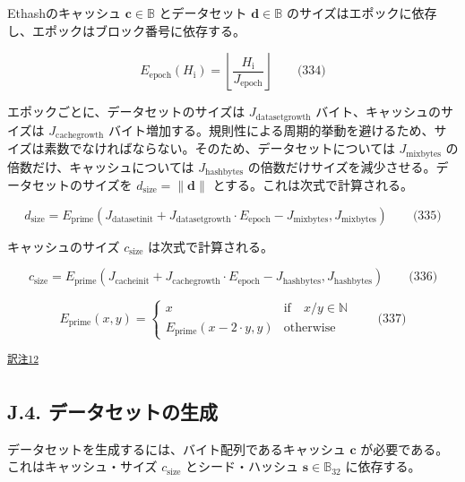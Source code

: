 \documentclass[
]{ltjsarticle}
\begin{document}
Ethashのキャッシュ \(\mathbf{c} \in \mathbb{B}\) とデータセット
\(\mathbf{d} \in \mathbb{B}\)
のサイズはエポックに依存し、エポックはブロック番号に依存する。

\protect\hypertarget{eq-334}{}{}

\[E_{\mathrm{epoch}}(H_{\mathrm{i}}) = \left\lfloor\frac{H_{\mathrm{i}}}{J_{\mathrm{epoch}}}\right\rfloor \qquad \text{(334)}\]

エポックごとに、データセットのサイズは \(J_{\mathrm{datasetgrowth}}\)
バイト、キャッシュのサイズは \(J_{\mathrm{cachegrowth}}\)
バイト増加する。規則性による周期的挙動を避けるため、サイズは素数でなければならない。そのため、データセットについては
\(J_{\mathrm{mixbytes}}\) の倍数だけ、キャッシュについては
\(J_{\mathrm{hashbytes}}\)
の倍数だけサイズを減少させる。データセットのサイズを
\(d_{\mathrm{size}} = \lVert \mathbf{d} \rVert\)
とする。これは次式で計算される。

\protect\hypertarget{eq-335}{}{}

\[d_{\mathrm{size}} = E_{\mathrm{prime}}(J_{\mathrm{datasetinit}} + J_{\mathrm{datasetgrowth}} \cdot E_{\mathrm{epoch}} - J_{\mathrm{mixbytes}}, J_{\mathrm{mixbytes}}) \qquad \text{(335)}\]

キャッシュのサイズ \(c_{\mathrm{size}}\) は次式で計算される。

\protect\hypertarget{eq-336}{}{}

\[c_{\mathrm{size}} = E_{\mathrm{prime}}(J_{\mathrm{cacheinit}} + J_{\mathrm{cachegrowth}} \cdot E_{\mathrm{epoch}} - J_{\mathrm{hashbytes}}, J_{\mathrm{hashbytes}}) \qquad \text{(336)}\]

\protect\hypertarget{eq-337}{}{}

\[E_{\mathrm{prime}}(x, y) = \begin{cases}
x & \text{if} \quad x / y \in \mathbb{N} \\
E_{\mathrm{prime}}(x - 2 \cdot y, y) & \text{otherwise}
\end{cases} \qquad \text{(337)}\]

\protect\hypertarget{tnref-12}{}{}\textsuperscript{\protect\hyperlink{tn-12}{訳注12}}

\hypertarget{j.4.-ux30c7ux30fcux30bfux30bbux30c3ux30c8ux306eux751fux6210}{%
\subsection{J.4.
データセットの生成}\label{j.4.-ux30c7ux30fcux30bfux30bbux30c3ux30c8ux306eux751fux6210}}

データセットを生成するには、バイト配列であるキャッシュ \(\mathbf{c}\)
が必要である。これはキャッシュ・サイズ \(c_{\mathrm{size}}\)
とシード・ハッシュ \(\mathbf{s} \in \mathbb{B}_{32}\) に依存する。
\end{document}
